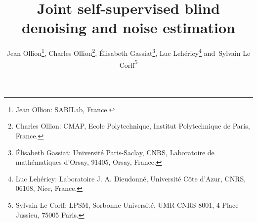 \documentclass[lettersize,journal]{IEEEtran}
\begin{document}
%
\title{Joint self-supervised blind denoising and noise estimation}
%
%
%

\author{Jean Ollion\thanks{Jean Ollion: SABILab, France.}, Charles Ollion\thanks{Charles Ollion:  CMAP, Ecole Polytechnique, Institut Polytechnique de Paris, France.},  \'Elisabeth Gassiat\thanks{\'Elisabeth Gassiat: Universit\'e Paris-Saclay, CNRS, Laboratoire de math\'ematiques d'Orsay, 91405, Orsay, France.},   Luc Leh\'ericy\thanks{Luc Leh\'ericy:   Laboratoire J. A. Dieudonn\'e, Universit\'e C\^ote d'Azur, CNRS, 06108, Nice, France.} and~Sylvain Le Corff\thanks{Sylvain Le Corff: LPSM, Sorbonne Université, UMR CNRS 8001, 4 Place Jussieu, 75005 Paris.}}

%
%
\end{document}
